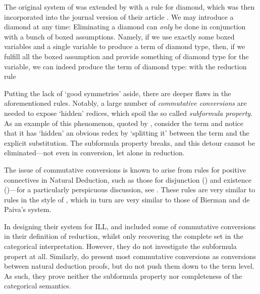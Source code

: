 \documentclass[a4paper]{amsart}
\begin{document}
The original system of \cite{Bierman1992a, Bierman1996a} was
extended by \cite{Kobayashi1997} with a rule for diamond, which
was then incorporated into the journal version of their article
\citep{Bierman2000a}. We may introduce a diamond at any time:  Eliminating a diamond can \emph{only} be done
in conjunction with a bunch of boxed assumptions. Namely, if we
use exactly some boxed variables  and a single
variable  to produce a term of diamond type, then, if we
fulfill all the boxed assumption and provide something of diamond
type for the  variable, we can indeed produce the term of
diamond type:  with the reduction rule 

Putting the lack of `good symmetries' aside, there are deeper
flaws in the aforementioned rules.  Notably, a large number of
\emph{commutative conversions} are needed to expose `hidden'
redices, which spoil the so called \emph{subformula property}. As
an example of this phenomenon, quoted by \cite{Pfenning1995},
consider the term  and notice that it has `hidden' an obvious redex by `splitting
it' between the term and the explicit substitution. The subformula
property breaks, and this detour cannot be eliminated---not even
in conversion, let alone in reduction.

The issue of commutative conversions is known to arise from rules
for positive connectives in Natural Deduction, such as those for
disjunction () and existence ()---for a particularly perspicuous discussion, see
\cite[\S 10.1]{Girard1989}. These rules are very similar to rules
in the style of \cite{Schroeder-Heister1984}, which in turn are
very similar to those of Bierman and de Paiva's system.

In designing their system for \textsf{ILL}, \cite{Bierman1992} and
\cite{Benton1993b} included some of commutative conversions in
their definition of reduction, whilst only recovering the complete
set in the categorical interpretation. However, they do not
investigate the subformula propert at all. Similarly,
\cite{Bierman2000a} do present most commutative conversions as
conversions between natural deduction proofs, but do not push them
down to the term level. As such, they prove neither the subformula
property nor completeness of the categorical semantics.
\end{document}
